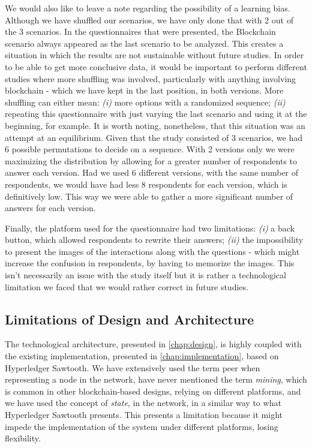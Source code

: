 We would also like to leave a note regarding the possibility of a learning bias. Although we have shuffled our scenarios, we have only done that with 2 out of the 3 scenarios. In the questionnaires that were presented, the Blockchain scenario always appeared as the last scenario to be analyzed. This creates a situation in which the results are not sustainable without future studies. In order to be able to get more conclusive data, it would be important to perform different studies where more shuffling was involved, particularly with anything involving blockchain - which we have kept in the last position, in both versions. More shuffling can either mean: \textit{(i)} more options with a randomized sequence; \textit{(ii)} repeating this questionnaire with just varying the last scenario and using it at the beginning, for example. It is worth noting, nonetheless, that this situation was an attempt at an equilibrium. Given that the study consisted of 3 scenarios, we had 6 possible permutations to decide on a sequence. With 2 versions only we were maximizing the distribution by allowing for a greater number of respondents to answer each version. Had we used 6 different versions, with the same number of respondents, we would have had less 8 respondents for each version, which is definitively low. This way we were able to gather a more significant number of answers for each version.

Finally, the platform used for the questionnaire had two limitations: \textit{(i)} a back button, which allowed respondents to rewrite their answers; \textit{(ii)} the impossibility to present the images of the interactions along with the questions - which might increase the confusion in respondents, by having to memorize the images. This isn't necessarily an issue with the study itself but it is rather a technological limitation we faced that we would rather correct in future studies.

\subsection{Limitations of Design and Architecture}

The technological architecture, presented in \ref{chap:design}, is highly coupled with the existing implementation, presented in \ref{chap:implementation}, based on Hyperledger Sawtooth. We have extensively used the term peer when representing a node in the network, have never mentioned the term \emph{mining}, which is common in other blockchain-based designs, relying on different platforms, and we have used the concept of \emph{state}, in the network, in a similar way to what Hyperledger Sawtooth presents. This presents a limitation because it might impede the implementation of the system under different platforms, losing flexibility.

